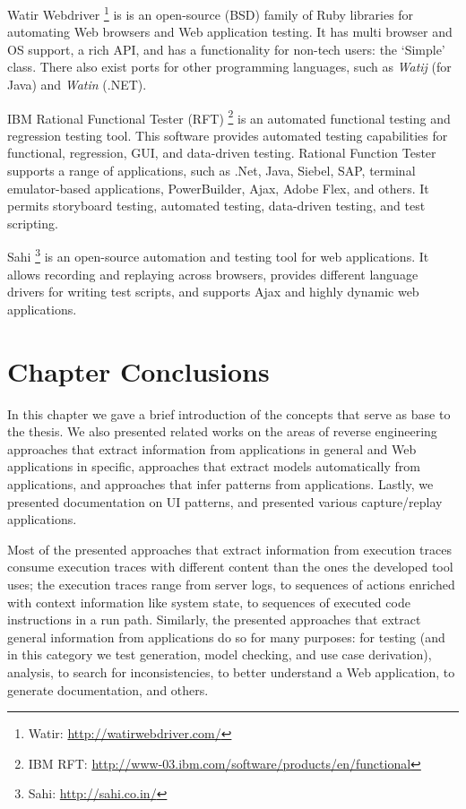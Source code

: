 Watir Webdriver \footnote{Watir: \url{http://watirwebdriver.com/}} is is an open-source (BSD) family of Ruby libraries for automating Web browsers and Web application testing. It has multi browser and OS support, a rich API, and has a functionality for non-tech users: the ‘Simple’ class. There also exist ports for other programming languages, such as \textit{Watij} (for Java) and \textit{Watin} (.NET).

IBM Rational Functional Tester (RFT) \footnote{IBM RFT: \url{http://www-03.ibm.com/software/products/en/functional}} is an automated functional testing and regression testing tool. This software provides automated testing capabilities for functional, regression, GUI, and data-driven testing. Rational Function Tester supports a range of applications, such as .Net, Java, Siebel, SAP, terminal emulator-based applications, PowerBuilder, Ajax, Adobe Flex, and others. It permits storyboard testing, automated testing, data-driven testing, and test scripting.

Sahi \footnote{Sahi: \url{http://sahi.co.in/}} is an open-source automation and testing tool for web applications. It allows recording and replaying across browsers, provides different language drivers for writing test scripts, and supports Ajax and highly dynamic web applications. 

\section{Chapter Conclusions}

In this chapter we gave a brief introduction of the concepts that serve as base to the thesis. We also presented related works on the areas of reverse engineering approaches that extract information from applications in general and Web applications in specific, approaches that extract models automatically from applications, and approaches that infer patterns from applications. Lastly, we presented documentation on UI patterns, and presented various capture/replay applications.

Most of the presented approaches that extract information from execution traces consume execution traces with different content than the ones the developed tool uses; the execution traces range from server logs, to sequences of actions enriched with context information like system state, to sequences of executed code instructions in a run path. Similarly, the presented approaches that extract general information from applications do so for many purposes: for testing (and in this category we test generation, model checking, and use case derivation), analysis, to search for inconsistencies, to better understand a Web application, to generate documentation, and others. 

